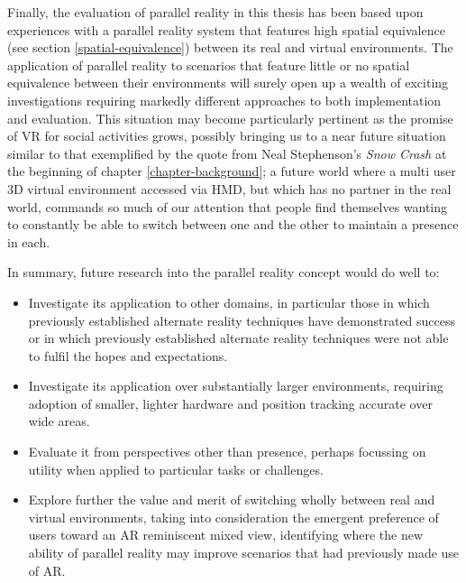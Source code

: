Finally, the evaluation of parallel reality in this thesis has been based upon experiences with a parallel reality system that features high spatial equivalence (see section \ref{spatial-equivalence}) between its real and virtual environments. The application of parallel reality to scenarios that feature little or no spatial equivalence between their environments will surely open up a wealth of exciting investigations requiring markedly different approaches to both implementation and evaluation. This situation may become particularly pertinent as the promise of VR for social activities grows, possibly bringing us to a near future situation similar to that exemplified by the quote from Neal Stephenson's \textit{Snow Crash} at the beginning of chapter \ref{chapter-background}; a future world where a multi user 3D virtual environment accessed via HMD, but which has no partner in the real world, commands so much of our attention that people find themselves wanting to constantly be able to switch between one and the other to maintain a presence in each.

In summary, future research into the parallel reality concept would do well to:
\begin{itemize}
	\item Investigate its application to other domains, in particular those in which previously established alternate reality techniques have demonstrated success or in which previously established alternate reality techniques were not able to fulfil the hopes and expectations.

	\item Investigate its application over substantially larger environments, requiring adoption of smaller, lighter hardware and position tracking accurate over wide areas.

	\item Evaluate it from perspectives other than presence, perhaps focussing on utility when applied to particular tasks or challenges.

	\item Explore further the value and merit of switching wholly between real and virtual environments, taking into consideration the emergent preference of users toward an AR reminiscent mixed view, identifying where the new ability of parallel reality may improve scenarios that had previously made use of AR.
\end{itemize}

